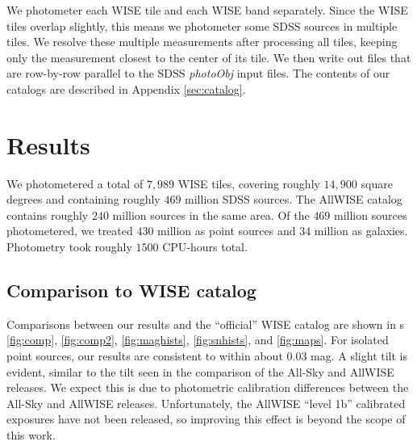 \documentclass[12pt,preprint]{aastex}
\begin{document}
We photometer each WISE tile and each WISE band separately.  Since the
WISE tiles overlap slightly, this means we photometer some SDSS
sources in multiple tiles.  We resolve these multiple measurements
after processing all tiles, keeping only the measurement closest to
the center of its tile.  We then write out files that are row-by-row
parallel to the SDSS \emph{photoObj} input files.  The contents of our
catalogs are described in Appendix \ref{sec:catalog}.


\section{Results}

We photometered a total of $7,\!989$ WISE tiles, covering roughly
$14,\!900$ square degrees and containing roughly $469$ million SDSS
sources.  The AllWISE catalog contains roughly $240$ million sources
in the same area.  Of the $469$ million sources photometered, we
treated $430$ million as point sources and $34$ million as galaxies.
Photometry took roughly $1500$ CPU-hours total.


\subsection{Comparison to WISE catalog}

Comparisons between our results and the ``official'' WISE catalog are
shown in \figurename s \ref{fig:comp}, \ref{fig:comp2},
\ref{fig:maghists}, \ref{fig:snhists}, and \ref{fig:maps}.  For isolated point
sources, our results are consistent to within about 0.03 mag.  A
slight tilt is evident, similar to the tilt seen in the comparison of
the All-Sky and AllWISE releases.  We expect this is due to
photometric calibration differences between the All-Sky and AllWISE
releases.  Unfortunately, the AllWISE ``level 1b'' calibrated
exposures have not been released, so improving this effect is beyond
the scope of this work.
\end{document}
